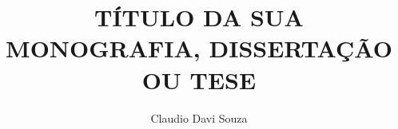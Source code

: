\newcommand{\monog}{%
\uppercase{TÍTULO DA SUA MONOGRAFIA, DISSERTAÇÃO OU TESE}
}
\title{\monog}
\newcommand{\por}{%
Claudio Davi Souza
}
\author{\por}

\newcommand{\subtitulo}{subtítulo deve começar em letra minúscula}

\newcommand{\univ}{\hspace{0.1cm}Pontifícia \hspace{0.1cm}Universidade\hspace{0.1cm} Católica \hspace{0.1cm}de\hspace{0.2cm} Santa\hspace{0.2cm} Catarina}

\newcommand{\curso}{\hspace{0.1cm} Programa \hspace{0.1cm} de \hspace{0.1cm} Pós-graduação\hspace{0.1cm} em \hspace{0.1cm} Big Data E Data Science}

\newcommand{\grau}{Especialista em Big Data e Data Science }
\newcommand{\tipo}{Monografia}

\newcommand{\profOrientador}{Prof. Nome do Professor}
\newcommand{\profA}{Prof. Nome do Avaliador}
\newcommand{\profB}{Prof. Nome do Avaliador}

\newcommand{\areaConcentracao}{Cadeia de Suprimentos e Previsão de Demanda}

\newcommand{\cidade}{Joinville}

\newcommand{\ano}{2019}

\newcommand{\dataCompleta}{31 de Novembro de 2019}
